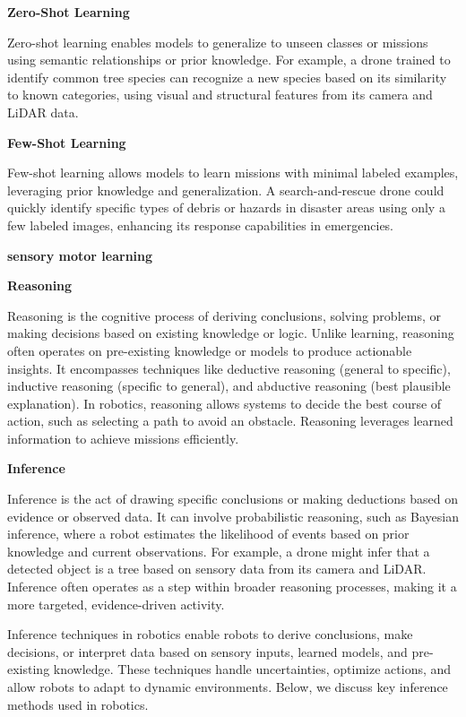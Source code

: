 \documentclass{book}
\providecommand{\ProjectDeepHeading}[2]{%
    \par\medskip\noindent\textbf{#2}\par\smallskip
}
\begin{document}
\ProjectDeepHeading{3}{Zero-Shot Learning}
Zero-shot learning enables models to generalize to unseen classes or missions using semantic relationships or prior knowledge. For example, a drone trained to identify common tree species can recognize a new species based on its similarity to known categories, using visual and structural features from its camera and LiDAR data.

\ProjectDeepHeading{3}{Few-Shot Learning}
Few-shot learning allows models to learn missions with minimal labeled examples, leveraging prior knowledge and generalization. A search-and-rescue drone could quickly identify specific types of debris or hazards in disaster areas using only a few labeled images, enhancing its response capabilities in emergencies.

\ProjectDeepHeading{3}{sensory motor learning}

\ProjectDeepHeading{2}{Reasoning}
Reasoning is the cognitive process of deriving conclusions, solving problems, or making decisions based on existing knowledge or logic. Unlike learning, reasoning often operates on pre-existing knowledge or models to produce actionable insights. It encompasses techniques like deductive reasoning (general to specific), inductive reasoning (specific to general), and abductive reasoning (best plausible explanation). In robotics, reasoning allows systems to decide the best course of action, such as selecting a path to avoid an obstacle. Reasoning leverages learned information to achieve missions efficiently.

\ProjectDeepHeading{2}{Inference}
Inference is the act of drawing specific conclusions or making deductions based on evidence or observed data. It can involve probabilistic reasoning, such as Bayesian inference, where a robot estimates the likelihood of events based on prior knowledge and current observations. For example, a drone might infer that a detected object is a tree based on sensory data from its camera and LiDAR. Inference often operates as a step within broader reasoning processes, making it a more targeted, evidence-driven activity. 

Inference techniques in robotics enable robots to derive conclusions, make decisions, or interpret data based on sensory inputs, learned models, and pre-existing knowledge. These techniques handle uncertainties, optimize actions, and allow robots to adapt to dynamic environments. Below, we discuss key inference methods used in robotics.
\end{document}
